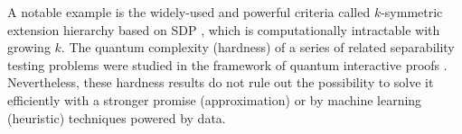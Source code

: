 \documentclass[
aps,
pra,
twocolumn,
floatfix,
]{revtex4-2}
\theoremstyle{plain}
\newtheorem{theorem}{Theorem}
\theoremstyle{definition}
\newtheorem{definition}{Definition}
\newcommand{\dm}{\rho}
\newcommand{\locc}{\textup{LOCC}}
\newcommand{\hamiltonian}{\hat{H}}
\begin{document}
A notable example is the widely-used and powerful criteria called $k$-symmetric extension hierarchy based on SDP \cite{dohertyCompleteFamilySeparability2004} \cite{ioannouComputationalComplexityQuantum2007} \cite{navascuesPowerSymmetricExtensions2009}, 
which is computationally intractable with growing $k$.
The quantum complexity (hardness) of a series of related separability testing problems were studied in the framework of quantum interactive proofs \cite{gutoskiQuantumInteractiveProofs2015}.
Nevertheless, these hardness results do not rule out the possibility to solve it efficiently with a stronger promise (approximation) or by machine learning (heuristic) techniques powered by data.



\end{document}

